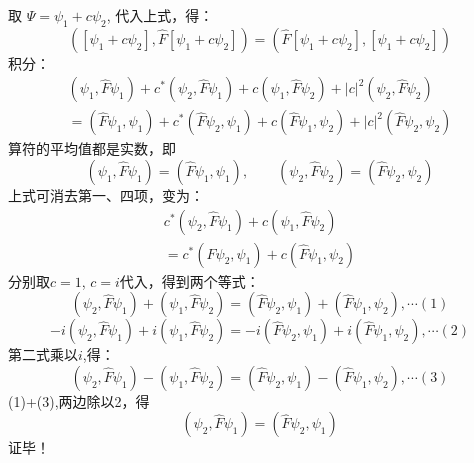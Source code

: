 \begin{frame} [allowframebreaks=]
        取 $\Psi= \psi_1+c\psi_2 $, 代入上式，得：
        $$([\psi_1+c\psi_2],\hat{F} [\psi_1+c\psi_2])=(\hat{F}[\psi_1+c\psi_2],[\psi_1+c\psi_2]) $$
        积分：
        $$
        \begin{array}{r}
        \left(\psi_{1}, \hat{F} \psi_{1}\right)+c^{*}\left(\psi_{2}, \hat{F} \psi_{1}\right)+c\left(\psi_{1}, \hat{F} \psi_{2}\right)+|c|^{2}\left(\psi_{2}, \hat{F} \psi_{2}\right) \\
        =\left(\hat{F} \psi_{1}, \psi_{1}\right)+c^{*}\left(\hat{F} \psi_{2}, \psi_{1}\right)+c\left(\hat{F} \psi_{1}, \psi_{2}\right)+|c|^{2}\left(\hat{F} \psi_{2}, \psi_{2}\right)
        \end{array}
        $$
        算符的平均值都是实数，即 
        $$(\psi_1,\hat{F}\psi_1)=(\hat{F} \psi_1, \psi_1), \qquad (\psi_2,\hat{F}\psi_2)=(\hat{F} \psi_2, \psi_2) $$
        上式可消去第一、四项，变为：
        $$\begin{array}{r}
            c^{*}\left(\psi_{2}, \hat{F} \psi_{1}\right)+c\left(\psi_{1}, \hat{F} \psi_{2}\right) \\
            =c^{*}\left(\hat{F} \psi_{2}, \psi_{1}\right)+c\left(\hat{F} \psi_{1}, \psi_{2}\right)
        \end{array}$$
        分别取$c=1$, $c=i$代入，得到两个等式：
        $$  \left(\psi_{2}, \hat{F} \psi_{1}\right)+\left(\psi_{1}, \hat{F} \psi_{2}\right) = 
        \left(\hat{F} \psi_{2}, \psi_{1}\right)+\left(\hat{F} \psi_{1}, \psi_{2}\right) , \cdots (1)
        $$
        $$
        -i\left(\psi_{2}, \hat{F} \psi_{1}\right)+i\left(\psi_{1}, \hat{F} \psi_{2}\right) 
        =-i\left(\hat{F} \psi_{2}, \psi_{1}\right)+i\left(\hat{F} \psi_{1}, \psi_{2}\right),\cdots (2)
        $$
        第二式乘以$i$,得：
        $$
        \left(\psi_{2}, \hat{F} \psi_{1}\right)-\left(\psi_{1}, \hat{F} \psi_{2}\right) 
        =\left(\hat{F} \psi_{2}, \psi_{1}\right)-\left(\hat{F} \psi_{1}, \psi_{2}\right), \cdots (3)
        $$
        (1)+(3),两边除以2，得
        $$
        \left(\psi_{2}, \hat{F} \psi_{1}\right) =\left(\hat{F} \psi_{2}, \psi_{1}\right)
        $$
        证毕！
\end{frame} 

